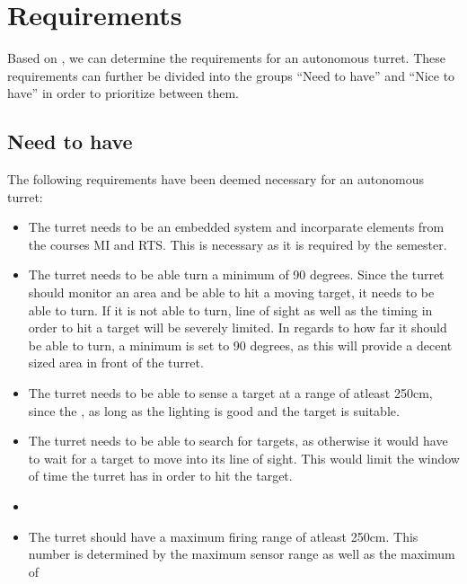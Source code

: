 \section{Requirements}

Based on , we can determine the requirements for an autonomous turret.
These requirements can further be divided into the groups ``Need to have'' and
``Nice to have'' in order to prioritize between them.

\subsection{Need to have}
The following requirements have been deemed necessary for an autonomous turret:
\begin{itemize}
  \item The turret needs to be an embedded system and incorparate elements from
  the courses MI and RTS. This is necessary as it is required by the semester.
  \item The turret needs to be able turn a minimum of 90 degrees. Since the
  turret should monitor an area and be able to hit a moving target, it needs to
  be able to turn. If it is not able to turn, line of sight as well as the
  timing in order to hit a target will be severely limited. In regards to how
  far it should be able to turn, a minimum is set to 90 degrees, as this will
  provide a decent sized area in front of the turret.
  \item The turret needs to be able to sense a target at a range of atleast
  250cm, since the , as long as the
  lighting is good and the target is suitable.
  \item The turret needs to be able to search for targets, as otherwise it would
  have to wait for a target to move into its line of sight. This would limit
  the window of time the turret has in order to hit the target.
  \item {}
  \item The turret should have a maximum firing range of atleast 250cm. This
  number is determined by the maximum sensor range as well as the maximum of

\end{itemize}
